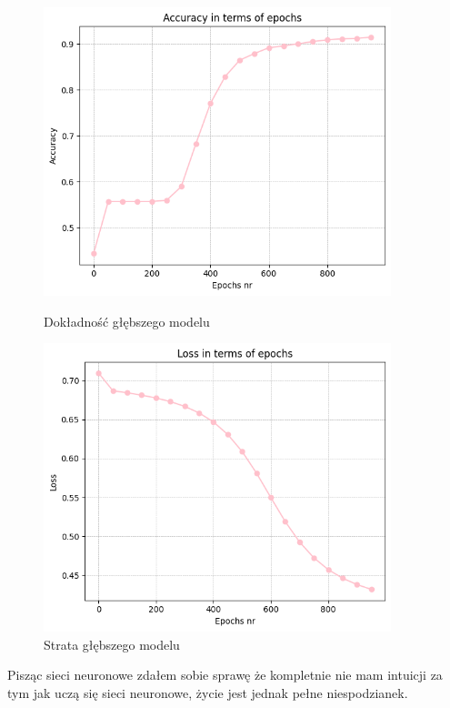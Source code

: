 \documentclass[polish,12pt,a4paper]{extarticle}
\begin{document}
\begin{figure}[h!]
    \centering
    \begin{minipage}[b]{0.48\textwidth}
    \includegraphics[width=0.9\textwidth]{img/bigger_accuracy.png}
    \caption{Dokładność głębszego modelu}
    \end{minipage}
     \hspace{0.02\textwidth}
    \begin{minipage}[b]{0.48\textwidth}
    \includegraphics[width=0.9\textwidth]{img/bigger_loss.png}
    \caption{Strata głębszego modelu}
    \end{minipage}
\end{figure}
\FloatBarrier

Pisząc sieci neuronowe zdałem sobie sprawę że kompletnie nie mam intuicji za tym jak uczą się sieci neuronowe, życie jest jednak pełne niespodzianek.
\end{document}
